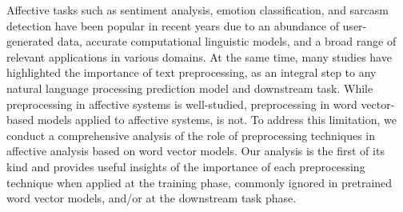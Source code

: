 Affective tasks such as sentiment analysis, emotion classification, and sarcasm detection have been popular in recent years due to an abundance of user-generated data, accurate computational linguistic models, and a broad range of relevant applications in various domains. At the same time, many studies have highlighted the importance of text preprocessing, as an integral step to any natural language processing prediction model and downstream task. While preprocessing in affective systems is well-studied, preprocessing in word vector-based models applied to affective systems, is not. To address this limitation, we conduct a comprehensive analysis of the role of preprocessing techniques in affective analysis based on word vector models. Our analysis is the first of its kind and provides useful insights of the importance of each preprocessing technique when applied at the training phase, commonly ignored in pretrained word vector models, and/or at the downstream task phase.
